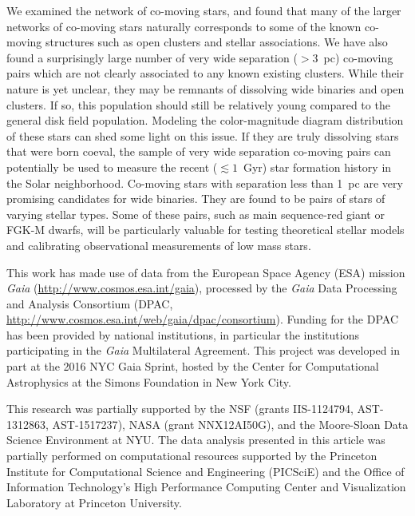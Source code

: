 \documentclass[manuscript, letterpaper]{aastex6}
\newcommand{\acronym}[1]{{\small{#1}}}
\begin{document}
We examined the network of co-moving stars, and found that many of the larger
networks of co-moving stars naturally corresponds to some of the known co-moving structures
such as open clusters and stellar associations.
We have also found a surprisingly large number of very wide separation ($>3$~pc)
co-moving pairs which are not clearly associated to any known existing clusters.
While their nature is yet unclear, they may be remnants of dissolving wide binaries and
open clusters. If so, this population should still be relatively young compared
to the general disk field population. Modeling the color-magnitude diagram
distribution of these stars can shed some light on this issue.
If they are truly dissolving stars that were born coeval,
the sample of very wide separation co-moving pairs can potentially be used
to measure the recent ($\lesssim 1$~Gyr)
star formation history in the Solar neighborhood.
Co-moving stars with separation less than 1~pc are very promising candidates
for wide binaries. They are found to be pairs of stars of varying stellar types.
Some of these pairs, such as main sequence-red giant or FGK-M dwarfs,
will be particularly valuable for testing theoretical
stellar models and calibrating observational measurements of low mass stars.


\acknowledgements

This work has made use of data from the European Space Agency (ESA)
mission {\it Gaia} (\url{http://www.cosmos.esa.int/gaia}), processed by
the {\it Gaia} Data Processing and Analysis Consortium (DPAC,
\url{http://www.cosmos.esa.int/web/gaia/dpac/consortium}). Funding
for the DPAC has been provided by national institutions, in particular
the institutions participating in the {\it Gaia} Multilateral Agreement.
This project was developed in part at the 2016 NYC Gaia Sprint,
hosted by the Center for Computational Astrophysics at the Simons Foundation in New York City.

This research was partially supported by the \acronym{NSF} (grants
  \acronym{IIS-1124794}, \acronym{AST-1312863}, \acronym{AST-1517237}),
  \acronym{NASA} (grant \acronym{NNX12AI50G}),
  and the Moore-Sloan Data Science Environment at \acronym{NYU}. The data
analysis presented in this article was partially performed on computational
resources supported by the Princeton Institute for Computational Science and
Engineering (PICSciE) and the Office of Information Technology's High
Performance Computing Center and Visualization Laboratory at Princeton
University.


\end{document}
